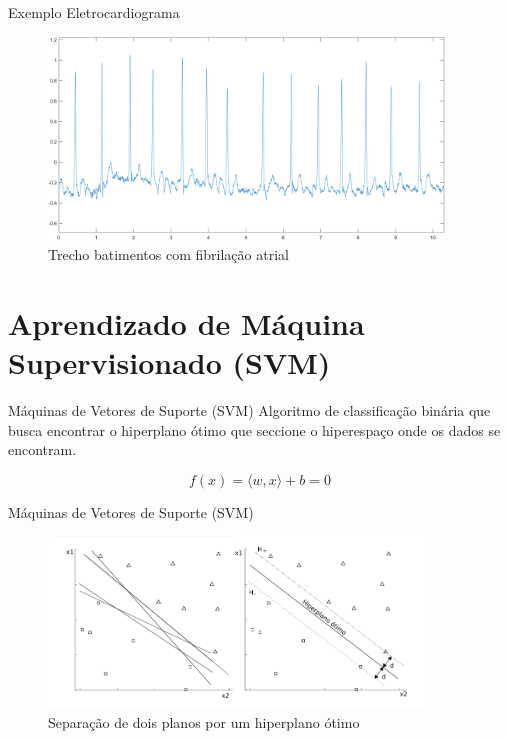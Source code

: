 \documentclass[10pt]{beamer}
\begin{document}
\begin{frame}{Exemplo Eletrocardiograma}
  \begin{figure}
    \includegraphics[width=10.5cm]{images/artrial_fibri.png}
    \caption{Trecho batimentos com fibrilação atrial}
  \end{figure}
\end{frame}

\section*{Aprendizado de Máquina Supervisionado (SVM)}
\begin{frame}{Máquinas de Vetores de Suporte (SVM)}
  Algoritmo de classificação binária que busca encontrar o hiperplano 
  ótimo que seccione o hiperespaço onde os dados se encontram.

  \begin{equation}
    f(x) = \langle w, x \rangle + b = 0
    \nonumber
  \end{equation}
\end{frame}

\begin{frame}{Máquinas de Vetores de Suporte (SVM)}
  \begin{figure}[]
    \centering
    \includegraphics[width=10cm]{images/svmSample.png}
    \caption{Separação de dois planos por um hiperplano ótimo}
    \label{fig:svm}
  \end{figure}
\end{frame}
\end{document}
